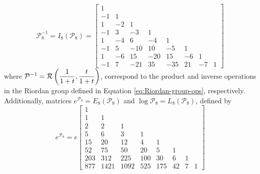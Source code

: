 \begin{example}
\begin{displaymath}
\mathcal{P}_{8}^{-1} = I_{8}\left( \mathcal{P}_{8}\right) = \left[\begin{matrix}1 &   &   &   &   &   &   &  \\-1 & 1 &   &   &   &   &   &  \\1 & -2 & 1 &   &   &   &   &  \\-1 & 3 & -3 & 1 &   &   &   &  \\1 & -4 & 6 & -4 & 1 &   &   &  \\-1 & 5 & -10 & 10 & -5 & 1 &   &  \\1 & -6 & 15 & -20 & 15 & -6 & 1 &  \\-1 & 7 & -21 & 35 & -35 & 21 & -7 & 1\end{matrix}\right]
\end{displaymath}
where $\displaystyle\mathcal{P}^{-1} = \mbox{$\mathcal{R}$}\left(\frac{1}{1+t},\frac{t}{1+t} \right)$,
correspond to the product and inverse operations in the Riordan group defined
in Equation \ref{eq:Riordan-group-ops}, respectively. Additionally, matrices
$e^{\mathcal{P}_{8}}= E_{8}\left( \mathcal{P}_{8}\right) $ and
$\log{\mathcal{P}_{8}}= L_{8}\left( \mathcal{P}_{8}\right) $, defined by
\begin{displaymath}
e^{\mathcal{P}_{8}} = e \left[\begin{matrix}1 &   &   &   &   &   &   &  \\1 & 1 &   &   &   &   &   &  \\2 & 2 & 1 &   &   &   &   &  \\5 & 6 & 3 & 1 &   &   &   &  \\15 & 20 & 12 & 4 & 1 &   &   &  \\52 & 75 & 50 & 20 & 5 & 1 &   &  \\203 & 312 & 225 & 100 & 30 & 6 & 1 &  \\877 & 1421 & 1092 & 525 & 175 & 42 & 7 & 1\end{matrix}\right]

\end{displaymath}
\end{example}
